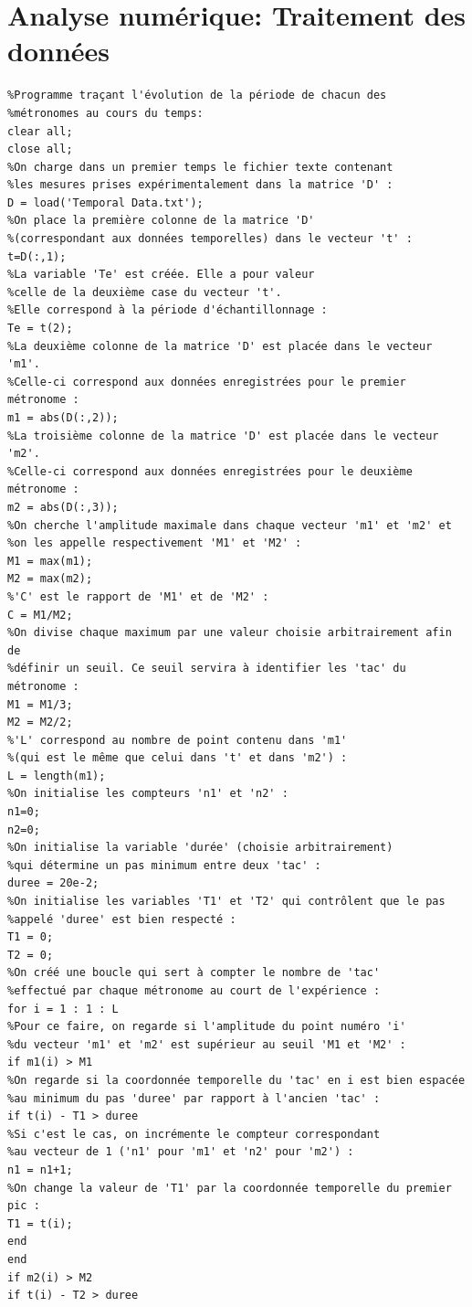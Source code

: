 \documentclass[a4paper,11pt]{report}
\begin{document}
\chapter{Analyse numérique: Traitement des données}
\label{Traitement}
\begin{verbatim}
%Programme traçant l'évolution de la période de chacun des 
%métronomes au cours du temps:
clear all;
close all;
%On charge dans un premier temps le fichier texte contenant
%les mesures prises expérimentalement dans la matrice 'D' :
D = load('Temporal Data.txt');
%On place la première colonne de la matrice 'D'
%(correspondant aux données temporelles) dans le vecteur 't' :
t=D(:,1);
%La variable 'Te' est créée. Elle a pour valeur
%celle de la deuxième case du vecteur 't'.
%Elle correspond à la période d'échantillonnage :
Te = t(2);
%La deuxième colonne de la matrice 'D' est placée dans le vecteur 'm1'.
%Celle-ci correspond aux données enregistrées pour le premier métronome :
m1 = abs(D(:,2));
%La troisième colonne de la matrice 'D' est placée dans le vecteur 'm2'.
%Celle-ci correspond aux données enregistrées pour le deuxième métronome :
m2 = abs(D(:,3));
%On cherche l'amplitude maximale dans chaque vecteur 'm1' et 'm2' et
%on les appelle respectivement 'M1' et 'M2' :
M1 = max(m1);
M2 = max(m2);
%'C' est le rapport de 'M1' et de 'M2' :
C = M1/M2;
%On divise chaque maximum par une valeur choisie arbitrairement afin de
%définir un seuil. Ce seuil servira à identifier les 'tac' du métronome :
M1 = M1/3;
M2 = M2/2;
%'L' correspond au nombre de point contenu dans 'm1'
%(qui est le même que celui dans 't' et dans 'm2') :
L = length(m1);
%On initialise les compteurs 'n1' et 'n2' :
n1=0;
n2=0;
%On initialise la variable 'durée' (choisie arbitrairement)
%qui détermine un pas minimum entre deux 'tac' :
duree = 20e-2;
%On initialise les variables 'T1' et 'T2' qui contrôlent que le pas
%appelé 'duree' est bien respecté :
T1 = 0;
T2 = 0;
%On créé une boucle qui sert à compter le nombre de 'tac'
%effectué par chaque métronome au court de l'expérience :
for i = 1 : 1 : L
%Pour ce faire, on regarde si l'amplitude du point numéro 'i'
%du vecteur 'm1' et 'm2' est supérieur au seuil 'M1 et 'M2' :
if m1(i) > M1
%On regarde si la coordonnée temporelle du 'tac' en i est bien espacée
%au minimum du pas 'duree' par rapport à l'ancien 'tac' :
if t(i) - T1 > duree
%Si c'est le cas, on incrémente le compteur correspondant
%au vecteur de 1 ('n1' pour 'm1' et 'n2' pour 'm2') :
n1 = n1+1;
%On change la valeur de 'T1' par la coordonnée temporelle du premier pic :
T1 = t(i);
end
end
if m2(i) > M2
if t(i) - T2 > duree

\end{verbatim}
\end{document}
